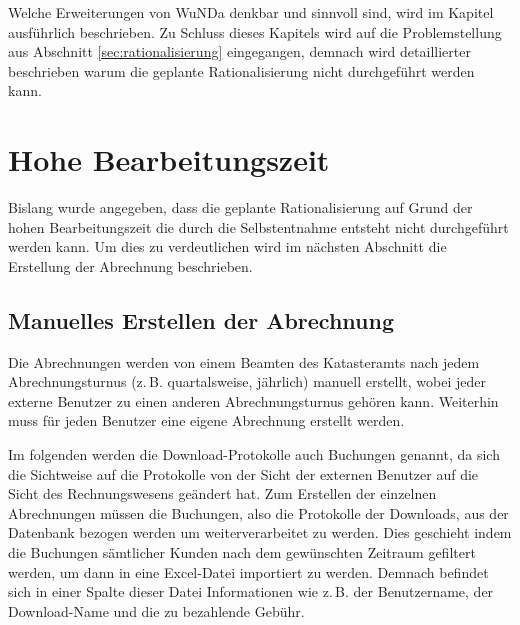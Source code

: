 \bigskip
Welche Erweiterungen von \ac{WuNDa} denkbar und sinnvoll sind, wird im Kapitel  ausführlich beschrieben. Zu Schluss dieses Kapitels wird auf die Problemstellung aus Abschnitt \ref{sec:rationalisierung} eingegangen, demnach wird detaillierter beschrieben warum die geplante Rationalisierung nicht durchgeführt werden kann.


\section{Hohe Bearbeitungszeit}

Bislang wurde angegeben, dass die geplante Rationalisierung auf Grund der hohen Bearbeitungszeit die durch die Selbstentnahme entsteht nicht durchgeführt werden kann. Um dies zu verdeutlichen wird im nächsten Abschnitt die Erstellung der Abrechnung beschrieben. 

\subsection{Manuelles Erstellen der Abrechnung}
Die Abrechnungen werden von einem Beamten des Katasteramts nach jedem Abrechnungsturnus (z.\,B. quartalsweise, jährlich) manuell erstellt, wobei jeder externe Benutzer zu einen anderen Abrechnungsturnus gehören kann.
Weiterhin muss für jeden Benutzer eine eigene Abrechnung erstellt werden.

Im folgenden werden die Download-Protokolle auch Buchungen genannt, da sich die Sichtweise auf die Protokolle von der Sicht der externen Benutzer auf die Sicht des Rechnungswesens geändert hat.
Zum Erstellen der einzelnen Abrechnungen müssen die Buchungen, also die Protokolle der Downloads, aus der Datenbank bezogen werden um weiterverarbeitet zu werden.
Dies geschieht indem die Buchungen sämtlicher Kunden nach dem gewünschten Zeitraum gefiltert werden, um dann in eine Excel-Datei importiert zu werden.
Demnach befindet sich in einer Spalte dieser Datei Informationen wie z.\,B. der Benutzername, der Download-Name und die zu bezahlende Gebühr.

